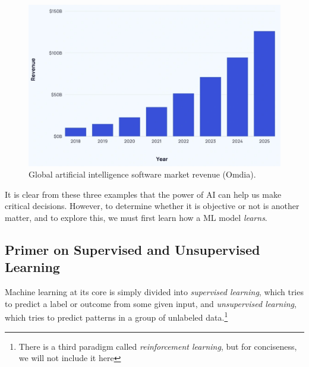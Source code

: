 \documentclass[10pt]{article}
\begin{document}
  \begin{figure}[H]
    \centering 
    \includegraphics[scale=0.4]{img/revenue.png}
    \caption{Global artificial intelligence software market revenue (Omdia). }
    \label{fig:revenue}
  \end{figure}

  It is clear from these three examples that the power of AI can help us make critical decisions. However, to determine whether it is objective or not is another matter, and to explore this, we must first learn how a ML model \textit{learns}. 

  \subsection{Primer on Supervised and Unsupervised Learning}

    Machine learning at its core is simply divided into \textit{supervised learning}, which tries to predict a label or outcome from some given input, and \textit{unsupervised learning}, which tries to predict patterns in a group of unlabeled data.\footnote{There is a third paradigm called \textit{reinforcement learning}, but for conciseness, we will not include it here} 
    
\end{document}
